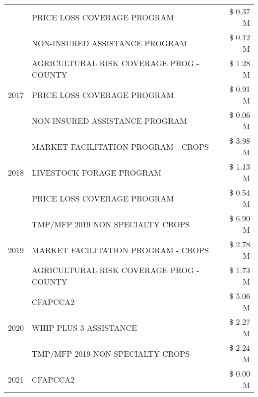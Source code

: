 \begin{tabular}{llr}
 & PRICE LOSS COVERAGE PROGRAM & \$ 0.37 M \\
 & NON-INSURED ASSISTANCE PROGRAM & \$ 0.12 M \\
\cline{1-3}
\multirow[t]{3}{*}{2017} & AGRICULTURAL RISK COVERAGE PROG - COUNTY & \$ 1.28 M \\
 & PRICE LOSS COVERAGE PROGRAM & \$ 0.91 M \\
 & NON-INSURED ASSISTANCE PROGRAM & \$ 0.06 M \\
\cline{1-3}
\multirow[t]{3}{*}{2018} & MARKET FACILITATION PROGRAM - CROPS & \$ 3.98 M \\
 & LIVESTOCK FORAGE PROGRAM & \$ 1.13 M \\
 & PRICE LOSS COVERAGE PROGRAM & \$ 0.54 M \\
\cline{1-3}
\multirow[t]{3}{*}{2019} & TMP/MFP 2019 NON SPECIALTY CROPS & \$ 6.90 M \\
 & MARKET FACILITATION PROGRAM - CROPS & \$ 2.78 M \\
 & AGRICULTURAL RISK COVERAGE PROG - COUNTY & \$ 1.73 M \\
\cline{1-3}
\multirow[t]{3}{*}{2020} & CFAPCCA2 & \$ 5.06 M \\
 & WHIP PLUS 3 ASSISTANCE & \$ 2.27 M \\
 & TMP/MFP 2019 NON SPECIALTY CROPS & \$ 2.24 M \\
\cline{1-3}
2021 & CFAPCCA2 & \$ 0.00 M \\
\cline{1-3}
\bottomrule
\end{tabular}

